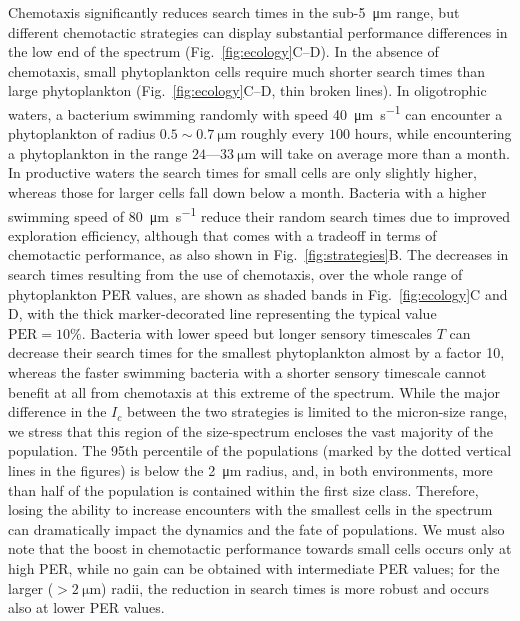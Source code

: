 \documentclass[9pt,twocolumn,twoside]{pnas-new}
\begin{document}
Chemotaxis significantly reduces search times in the sub-\SI{5}{\micro\m} range, but different chemotactic strategies can display substantial performance differences in the low end of the spectrum (Fig.~\ref{fig:ecology}C--D).
In the absence of chemotaxis, small phytoplankton cells require much shorter search times than large phytoplankton (Fig.~\ref{fig:ecology}C--D, thin broken lines).
In oligotrophic waters, a bacterium swimming randomly with speed \SI{40}{\micro\m\per\s} can encounter a phytoplankton of radius $0.5\sim\SI{0.7}{\micro\m}$ roughly every $100$ hours, while encountering a phytoplankton in the range $24\text{---}\SI{33}{\micro\m}$ will take on average more than a month. 
%
In productive waters the search times for small cells are only slightly higher, whereas those for larger cells fall down below a month. Bacteria with a higher swimming speed of \SI{80}{\micro\m\per\s} reduce their random search times due to improved exploration efficiency, although that comes with a tradeoff in terms of chemotactic performance, as also shown in Fig.~\ref{fig:strategies}B.
The decreases in search times resulting from the use of chemotaxis, over the whole range of phytoplankton PER values, are shown as shaded bands in Fig.~\ref{fig:ecology}C and D, with the thick marker-decorated line representing the typical value $\mathrm{PER}=10\%$.
Bacteria with lower speed but longer sensory timescales $T$ can decrease their search times for the smallest phytoplankton almost by a factor 10, whereas the faster swimming bacteria with a shorter sensory timescale cannot benefit at all from chemotaxis at this extreme of the spectrum.
While the major difference in the $I_c$ between the two strategies is limited to the micron-size range, we stress that this region of the size-spectrum encloses the vast majority of the population.
The 95th percentile of the populations (marked by the dotted vertical lines in the figures) is below the \SI{2}{\micro\m} radius, and, in both environments, more than half of the population is contained within the first size class.
Therefore, losing the ability to increase encounters with the smallest cells in the spectrum can dramatically impact the dynamics and the fate of populations.
We must also note that the boost in chemotactic performance towards small cells occurs only at high PER, while no gain can be obtained with intermediate PER values; for the larger ($>\SI{2}{\micro\m}$) radii, the reduction in search times is more robust and occurs also at lower PER values.
\end{document}
